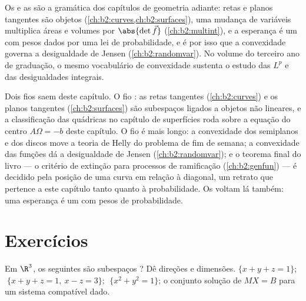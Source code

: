 \begin{remark}
Os  e as  são a gramática dos capítulos
de geometria adiante: retas e planos tangentes são objetos 
(\cref{ch:b2:curves,ch:b2:surfaces}), uma mudança  de
variáveis multiplica áreas e volumes por
$\abs{\det \vec f}$ (\cref{ch:b2:multint}), e a esperança
é um  com pesos dados por uma lei de probabilidade, e é por isso
que a convexidade governa a desigualdade de Jensen
(\cref{ch:b2:randomvar}). No volume do terceiro ano de graduação, o mesmo
vocabulário de convexidade sustenta o estudo das  $L^p$ e das
desigualdades integrais.
\end{remark}

\begin{remark}
Dois fios saem deste capítulo. O fio \emph{}: as retas
tangentes (\cref{ch:b2:curves}) e os planos tangentes
(\cref{ch:b2:surfaces}) são subespaços  ligados a
objetos não lineares, e a classificação das quádricas no
capítulo de superfícies roda sobre a equação do centro
$A\Omega = -b$ deste capítulo. O fio \emph{} é mais longo: a convexidade
dos semiplanos e dos discos move a teoria de Helly do
problema de fim de semana; a convexidade das funções dá a desigualdade
de Jensen (\cref{ch:b2:randomvar}); e o teorema final
do livro --- o critério de extinção para processos de ramificação
(\cref{ch:b2:genfun}) --- é decidido pela posição de uma
curva  em relação à diagonal, um retrato que pertence
a este capítulo tanto quanto à probabilidade. Os 
voltam lá também: uma esperança é um  com
pesos de probabilidade.
\end{remark}

\section{Exercícios}

\begin{exercise}[$\star$]\label{exo:b2:affine:1}
Em $\R^3$, os seguintes são subespaços ? Dê direções e
dimensões. $\{x + y + z = 1\}$; $\;\{x + y + z = 1,\ x - z =
3\}$; $\;\{x^2 + y^2 = 1\}$; o conjunto solução de $MX = B$ para um
sistema compatível dado.
\end{exercise}


